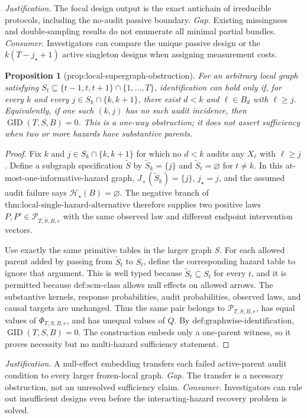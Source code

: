 \documentclass{article}
\newtheorem{proposition}{Proposition}
\begin{document}
\par\smallskip\noindent \textit{Justification.} The focal design output is the exact antichain of irreducible protocols, including the no-audit passive boundary. \textit{Gap.} Existing missingness and double-sampling results do not enumerate all minimal partial bundles. \textit{Consumer.} Investigators can compare the unique passive design or the \(k(T-j_\star+1)\) active singleton designs when assigning measurement costs.

\begin{proposition}[prop:local-supergraph-obstruction]\label{prop:local-supergraph-obstruction}
For an arbitrary local graph satisfying
\(S_t\subseteq\{t-1,t,t+1\}\cap\{1,\ldots,T\}\), identification can hold only if, for every \(k\) and every
\(j\in S_k\cap\{k,k+1\}\), there exist \(d<k\) and
\(\ell\in B_d\) with \(\ell\ge j\).  Equivalently, if one such \((k,j)\) has no such audit incidence, then
\(\operatorname{GID}(T,S,B)=0\).  This is a one-way obstruction; it does not assert sufficiency when two or more hazards have substantive parents.
\end{proposition}
\begin{proof}
Fix \(k\) and \(j\in S_k\cap\{k,k+1\}\) for which no \(d<k\) audits any \(X_\ell\) with \(\ell\ge j\).  Define a subgraph specification
\(\widetilde S\) by \(\widetilde S_k=\{j\}\) and
\(\widetilde S_t=\varnothing\) for \(t\ne k\).  In this at-most-one-informative-hazard graph,
\(J_+(\widetilde S_k)=\{j\}\), \(j_\star=j\), and the assumed audit failure says
\(\mathcal H_\star(B)=\varnothing\).  The negative branch of
\(\text{thm:local-single-hazard-alternative}\) therefore supplies two positive laws \(P,P'\in\mathcal P_{T,\widetilde S,B,e}\) with the same observed law and different endpoint intervention vectors.

Use exactly the same primitive tables in the larger graph \(S\).  For each allowed parent added by passing from \(\widetilde S_t\) to \(S_t\), define the corresponding hazard table to ignore that argument.  This is well typed because
\(\widetilde S_t\subseteq S_t\) for every \(t\), and it is permitted because
\(\text{def:scm-class}\) allows null effects on allowed arrows.  The substantive kernels, response probabilities, audit probabilities, observed laws, and causal targets are unchanged.  Thus the same pair belongs to
\(\mathcal P_{T,S,B,e}\), has equal values of \(\Phi_{T,S,B,e}\), and has unequal values of \(Q\).  By \(\text{def:graphwise-identification}\),
\(\operatorname{GID}(T,S,B)=0\).  The construction embeds only a one-parent witness, so it proves necessity but no multi-hazard sufficiency statement.
\end{proof}
\par\smallskip\noindent \textit{Justification.} A null-effect embedding transfers each failed active-parent audit condition to every larger frozen-local graph. \textit{Gap.} The transfer is a necessary obstruction, not an unresolved sufficiency claim. \textit{Consumer.} Investigators can rule out insufficient designs even before the interacting-hazard recovery problem is solved.
\end{document}
